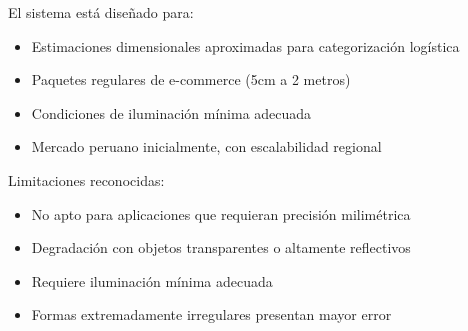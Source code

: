 El sistema está diseñado para:

\begin{itemize}
    \item Estimaciones dimensionales aproximadas para categorización logística
    \item Paquetes regulares de e-commerce (5cm a 2 metros)
    \item Condiciones de iluminación mínima adecuada
    \item Mercado peruano inicialmente, con escalabilidad regional
\end{itemize}

Limitaciones reconocidas:

\begin{itemize}
    \item No apto para aplicaciones que requieran precisión milimétrica
    \item Degradación con objetos transparentes o altamente reflectivos
    \item Requiere iluminación mínima adecuada
    \item Formas extremadamente irregulares presentan mayor error
\end{itemize}